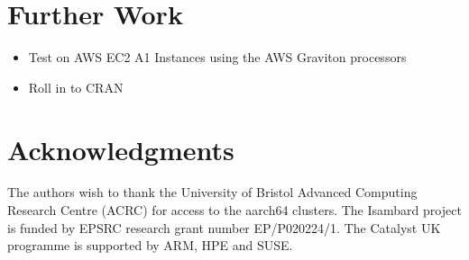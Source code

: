 \documentclass{article}
\begin{document}
\section{Further Work}

\begin{itemize}
    \item Test on AWS EC2 A1 Instances using the AWS Graviton processors
    \item Roll in to CRAN 
\end{itemize}

\section{Acknowledgments}

The authors wish to thank the University of Bristol Advanced Computing Research Centre (\textsc{ACRC}) for access to the aarch64 clusters. The Isambard project is funded by EPSRC research grant number EP/P020224/1. The Catalyst UK programme is supported by ARM, HPE and SUSE.
\end{document}
